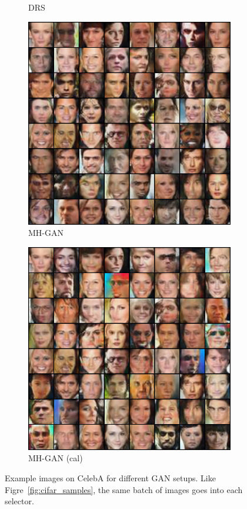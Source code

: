 \begin{figure}[htbp]
\begin{subfigure}[b]{0.49\textwidth}
       \caption{DRS}
    \end{subfigure}
    \begin{subfigure}[b]{0.49\textwidth}
       \centering
       \includegraphics[width=1.0\textwidth]{figures/celeba/31_base_raw_MH.png}
       \caption{MH-GAN}
    \end{subfigure}
    \begin{subfigure}[b]{0.49\textwidth}
       \centering
       \includegraphics[width=1.0\textwidth]{figures/celeba/31_base_iso_MH.png}
       \caption{MH-GAN (cal)}
    \end{subfigure}
    \caption{{\small
    Example images on CelebA for different GAN setups.
    Like Figre~\ref{fig:cifar_samples}, the same batch of images goes into each selector.
    }}
    \label{fig:celeba_samples}
\end{figure}

